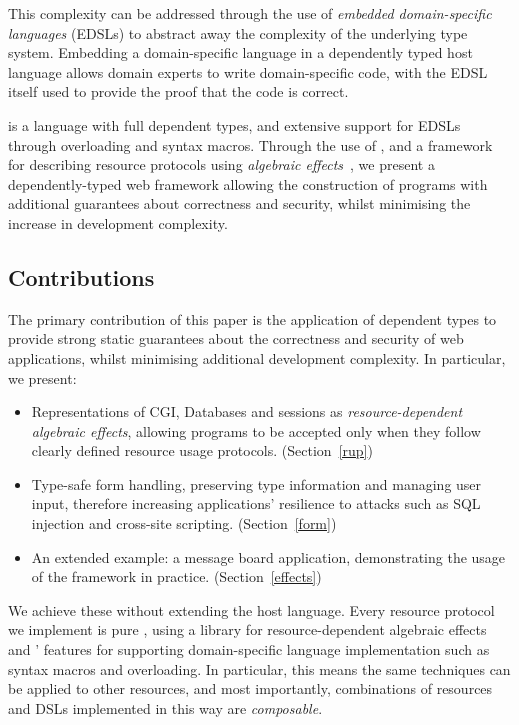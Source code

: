This complexity can be addressed through the use of \textit{embedded
domain-specific languages} (EDSLs) to abstract away the complexity of the
underlying type system. Embedding a domain-specific language in
a dependently typed host language
allows domain experts to write 
domain-specific code, with the EDSL itself used to provide the proof that the
code is correct.

\idris{} \cite{brady2013idris} is a language with full dependent types, and
extensive support for EDSLs through overloading and syntax macros. Through the
use of \idris{}, and a framework for describing resource protocols using
\emph{algebraic effects}~\cite{brady:effects}, we
present a dependently-typed web framework allowing the construction of
programs with additional guarantees about correctness and security, whilst
minimising the increase in development complexity. 

\subsection{Contributions}
The primary contribution of this paper is the application of 
dependent types to provide strong static guarantees
about the correctness and security of web applications, whilst minimising
additional development complexity. In particular, we present:

\begin{itemize}
\item Representations of CGI, Databases and sessions as
\textit{resource-dependent algebraic effects}, allowing programs to be accepted
only when they follow clearly defined resource usage protocols. 
(Section~\ref{rup})

\item Type-safe form handling, preserving type information and managing
user input, therefore increasing applications' resilience to attacks such as
SQL injection and cross-site scripting. (Section~\ref{form})

\item An extended example: a message board application, demonstrating the usage
of the framework in practice. (Section~\ref{effects})

\end{itemize}

We achieve these without extending the host language. Every
resource protocol we implement is pure \Idris{}, using a library for
resource-dependent algebraic effects~\cite{brady:effects} and \Idris{}'
features for supporting domain-specific language implementation such as
syntax macros and overloading. In particular, this means the same techniques
can be applied to other resources, and most importantly, combinations
of resources and DSLs implemented in this way are \emph{composable}.

